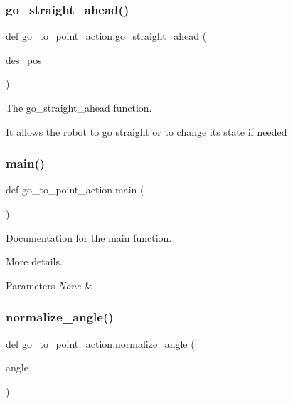 \subsubsection{\texorpdfstring{go\+\_\+straight\+\_\+ahead()}{go\_straight\_ahead()}}
{\footnotesize\ttfamily def go\+\_\+to\+\_\+point\+\_\+action.\+go\+\_\+straight\+\_\+ahead (\begin{DoxyParamCaption}\item[{}]{des\+\_\+pos }\end{DoxyParamCaption})}



The go\+\_\+straight\+\_\+ahead function. 

It allows the robot to go straight or to change it\textquotesingle{}s state if needed \mbox{\label{namespacego__to__point__action_a33cfc08b34e07f53ddda67d2ab551ba1}} 
\subsubsection{\texorpdfstring{main()}{main()}}
{\footnotesize\ttfamily def go\+\_\+to\+\_\+point\+\_\+action.\+main (\begin{DoxyParamCaption}{ }\end{DoxyParamCaption})}



Documentation for the main function. 

More details.


\begin{DoxyParams}{Parameters}
{\em None} & \\
\hline
\end{DoxyParams}
\mbox{\label{namespacego__to__point__action_a0bca87c6d45ca63d3152a4e8def72e2a}} 
\subsubsection{\texorpdfstring{normalize\+\_\+angle()}{normalize\_angle()}}
{\footnotesize\ttfamily def go\+\_\+to\+\_\+point\+\_\+action.\+normalize\+\_\+angle (\begin{DoxyParamCaption}\item[{}]{angle }\end{DoxyParamCaption})}



